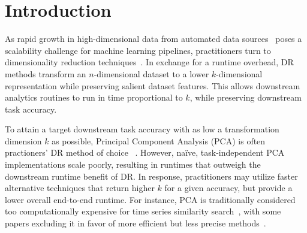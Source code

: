 
\section{Introduction}
\label{sec:intro}

As rapid growth in high-dimensional data from automated data sources~\cite{plato,macrobase-cidr} poses a scalability challenge for machine learning pipelines, practitioners turn to dimensionality reduction techniques~\cite{keogh-indexing,local-dr,decade,gemini}.
In exchange for a runtime overhead, DR methods transform an $n$-dimensional dataset to a lower $k$-dimensional representation while preserving salient dataset features.
This allows downstream analytics routines to run in time proportional to $k$, while preserving downstream task accuracy.

To attain a target downstream task accuracy with as low a transformation dimension $k$ as possible, Principal Component Analysis (PCA) is often practioners' DR method of choice ~\cite{jolbook}. 
However, na\"{i}ve, task-independent PCA implementations scale poorly, resulting in runtimes that outweigh the downstream runtime benefit of DR. 
In response, practitioners may utilize faster alternative techniques that return higher $k$ for a given accuracy, but provide a lower overall end-to-end runtime. 
For instance, PCA is traditionally considered too computationally expensive for time series similarity search~\cite{time-series-dm}, with some papers excluding it in favor of more efficient but less precise methods~\cite{keogh-study}. 


